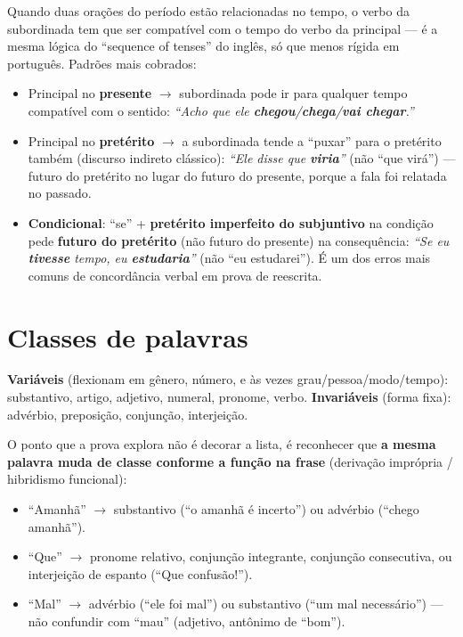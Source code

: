 \begin{conceito}
Quando duas orações do período estão relacionadas no tempo, o verbo da
subordinada tem que ser compatível com o tempo do verbo da principal --- é a
mesma lógica do “sequence of tenses” do inglês, só que menos rígida em
português. Padrões mais cobrados:

\begin{itemize}
\item Principal no \textbf{presente} $\to$ subordinada pode ir para
qualquer tempo compatível com o sentido: \textit{“Acho que ele
\textbf{chegou}/\textbf{chega}/\textbf{vai chegar}.”}
\item Principal no \textbf{pretérito} $\to$ a subordinada tende a
“puxar” para o pretérito também (discurso indireto clássico):
\textit{“Ele disse que \textbf{viria}”} (não “que virá”) --- futuro do
pretérito no lugar do futuro do presente, porque a fala foi relatada no
passado.
\item \textbf{Condicional}: “se” + \textbf{pretérito imperfeito do
subjuntivo} na condição pede \textbf{futuro do pretérito} (não futuro do
presente) na consequência: \textit{“Se eu \textbf{tivesse} tempo, eu
\textbf{estudaria}”} (não “eu estudarei”). É um dos erros mais comuns de
concordância verbal em prova de reescrita.
\end{itemize}
\end{conceito}

\section{Classes de palavras}

\begin{conceito}
\textbf{Variáveis} (flexionam em gênero, número, e às vezes grau/pessoa/modo/tempo):
substantivo, artigo, adjetivo, numeral, pronome, verbo.
\textbf{Invariáveis} (forma fixa): advérbio, preposição, conjunção,
interjeição.

O ponto que a prova explora não é decorar a lista, é reconhecer que
\textbf{a mesma palavra muda de classe conforme a função na frase}
(derivação imprópria / hibridismo funcional):
\begin{itemize}
\item “Amanhã” $\to$ substantivo (“o amanhã é incerto”) ou advérbio
(“chego amanhã”).
\item “Que” $\to$ pronome relativo, conjunção integrante, conjunção
consecutiva, ou interjeição de espanto (“Que confusão!”).
\item “Mal” $\to$ advérbio (“ele foi mal”) ou substantivo (“um mal
necessário”) --- não confundir com “mau” (adjetivo, antônimo de “bom”).
\end{itemize}
\end{conceito}

